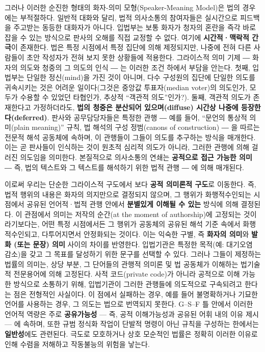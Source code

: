 \documentclass[12pt,a4paper]{article}
\begin{document}
그러나 이러한 순진한 형태의 화자-의미 모형(Speaker-Meaning Model)은 법의
경우에는 부적절하다. 일반적 대화와 달리, 법적 의사소통의 참여자들은
실시간으로 피드백을 주고받는 동등한 대화자가 아니다. 입법부는 보통
화자가 청자의 혼란을 즉각 바로잡을 수 있는 방식으로 판사의 오해를 직접
교정할 수 없다. 여기에 \textbf{시간적·맥락적 간극}이 존재한다. 법은 특정
시점에서 특정 집단에 의해 제정되지만, 나중에 전혀 다른 사람들이 초안
작성자가 전혀 보지 못한 상황들에 적용한다. 그라이스적 의미 기제 ― 화자의
의도와 청중의 그 의도의 인식 ― 는 이러한 조건 하에서 부담을 안는다.
첫째, 입법부는 단일한 정신(mind)을 가진 것이 아니며, 다수 구성원의
집단에 단일한 의도를 귀속시키는 것은 어려운 일이다(그것은 중앙값
투표자(median voter)의 의도인가, 모두가 수용할 수 있었던 타협인가,
추상적 ``객관적 의도''인가?). 둘째, 객관적 의도가 존재한다고
가정하더라도, \textbf{법의 청중은 분산되어 있으며(diffuse) 시간상 나중에
등장한다(deferred)}. 판사와 공무담당자들은 특정한 관행 ― 예를 들어,
``문언의 통상적 의미(plain meaning)'' 규칙, 법 해석의 구성 정범(canons
of construction) ― 을 따르는 전문적 해석 공동체에 속하며, 이 관행들이
그들이 의도를 추구하는 방식을 매개한다. 이는 곧 판사들이 인식하는 것이
원초적 심리적 의도가 아니라, 그러한 관행에 의해 걸러진 의도임을
의미한다. 본질적으로 의사소통의 연쇄는 \textbf{공적으로 접근 가능한
의미} ― 즉, 법의 텍스트와 그 텍스트를 해석하기 위한 법적 관행 ― 에 의해
매개된다.

이로써 우리는 단순한 그라이스적 구도에서 보다 \textbf{공적 의미론적
구도}로 이동한다. 즉, 법적 행위의 내용은 화자의 의지만으로 결정되지
않으며, 그 행위가 화행적수인되는 시점에서 공유된 언어적·법적 관행 안에서
\textbf{분별있게 이해될 수 있는} 방식에 의해 결정된다. 이 관점에서
의미는 \textsf{저작의 순간(at the moment of authorship)}에 고정되는
것이라기보다는, 어떤 특정 시점에서든 그 행위가 공동체의 공유된 해석 기준
속에서 화행적수인되고, 다투어지면서 안정화되는 것이다. 이는 익숙한 구별,
즉 \textbf{화자의 의미}와 \textbf{발화 (또는 문장) 의미} 사이의 차이를
반영한다\autocite{grice1989}. 입법기관은 특정한 목적(예: 대기오염 감소)을
갖고 그 목표를 달성하기 위한 문구를 선택할 수 있다. 그러나 그들이
제정하는 법률의 의미는, 상당 부분, 그 단어들의 관행적 의미론 및 법
공동체가 이해하는 법기술적 전문용어에 의해 고정된다. 사적 코드(private
code)가 아니라 공적으로 이해 가능한 방식으로 소통하기 위해, 입법기관이
그러한 관행들에 의도적으로 구속되려고 한다는 점은 전형적인 사실이다. 이
점에서 실패하는 경우, 예를 들어 불명확하거나 기묘한 언어를 사용하는
경우, 그 의도는 법으로 번역되지 못한다. G--S--F 틀 안에서 이러한 언어적
역량은 주로 \textbf{공유가능성} --- 즉, 공적 이해가능성과 공유된 어휘
내의 이유 제시 --- 에 속하며, 또한 규범 정식화 작업이 단발적 명령이 아닌
규칙을 구성하는 한에서는 \textbf{일반성}에도 관련된다. 극도로 모호하거나
상호 모순적인 법률은 정확히 이러한 이유로 인해 수렴을 저해하고
작동불능의 위험을 낳는다.
\end{document}
